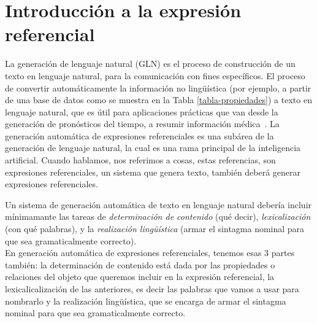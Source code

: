 \chapter{Introducci\'on a la expresi\'on referencial}
\label{sec:intro}



La generaci\'on de lenguaje natural (GLN) es el proceso de construcci\'on de un texto en lenguaje natural, para la comunicaci\'on con fines espec\'ificos. El proceso de convertir autom\'aticamente la informaci\'on no ling\"u\'{i}stica (por ejemplo, a partir de una base de datos como se muestra en la Tabla \ref{tabla-propiedades}) a texto en lenguaje natural, que es \'util para aplicaciones pr\'acticas que van desde la generaci\'on de pron\'osticos del tiempo, a resumir informaci\'on m\'edica~\cite{dale2000}. La generaci\'on autom\'atica de expresiones referenciales es una sub\'area de la generaci\'on de lenguaje natural, la cual es una rama principal de la inteligencia artificial. Cuando hablamos, nos referimos a cosas, estas referencias, son expresiones referenciales, un sistema que genera texto, tambi\'en deber\'a generar expresiones referenciales.


Un sistema de generaci\'on autom\'atica de texto en lenguaje natural deber\'ia incluir m\'inimamante 
las tareas de \emph{determinaci\'on de contenido} (qu\'e decir), \emph{lexicalizaci\'on} (con qu\'e palabras), y la \emph{realizaci\'on ling\"{u}\'istica} (armar el  sintagma nominal para que sea gramaticalmente correcto). \\
En generaci\'on autom\'atica de expresiones referenciales, tenemos esas 3 partes tambi\'en: la determinaci\'on de contenido est\'a dada por las propiedades o relaciones del objeto que queremos incluir en la expresi\'on referencial, la lexicalicalizaci\'on de las anteriores, es decir las palabras que vamos a usar para nombrarlo y la realizaci\'on ling\"u\'istica, que se encarga de armar el sintagma nominal para que sea gramaticalmente correcto.\\

